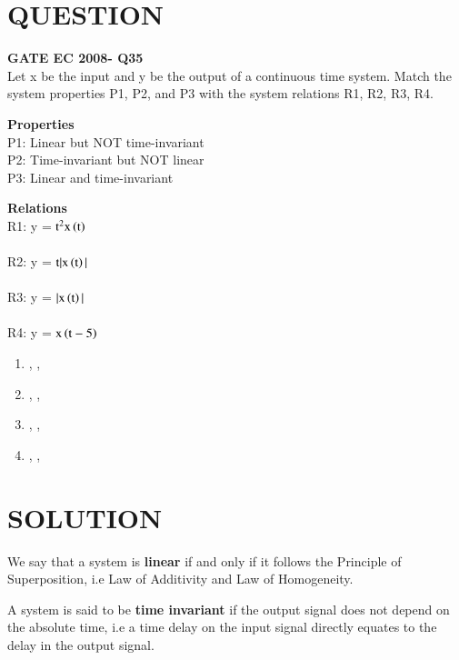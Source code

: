 \documentclass[journal,12pt,twocolumn]{IEEEtran}
\begin{document}
\section*{QUESTION}
\textbf{GATE EC 2008- Q35}\\
Let x be the input and y be the output of a continuous time system. Match the system properties P1, P2, and P3 with the system relations R1, R2, R3, R4.
\begin{multicols}{2}


\textbf{Properties}\\
P1: Linear but NOT time-invariant\\
P2: Time-invariant but NOT linear\\
P3: Linear and time-invariant
\columnbreak

\textbf{Relations}\\
R1: y = $\text{t}^2\text{x}\left(\text{t}\right)$ \\
\\
R2: y = $\text{t}| \text{x}\left(\text{t}\right)|$ \\
\\
R3: y = $| \text{x}\left(\text{t}\right)|$ \\
\\
R4: y = $\text{x}\left(\text{t}-5\right)$ \\


\end{multicols}
\begin{enumerate}
\item {}, , 
\item {}, , 
\item {}, , 
\item {}, , 
\end{enumerate}
\section*{SOLUTION}
\begin{definition}
We say that a system is\textbf{ linear} if and only if it follows the Principle of Superposition, i.e Law of Additivity and Law of Homogeneity.
\label{L}
\end{definition}
\begin{definition}
A system is said to be \textbf{time invariant} if the output signal does not depend on the absolute time, i.e a time delay on the input signal directly equates to the delay in the output signal.
\label{T}
\end{definition}
\end{document}
